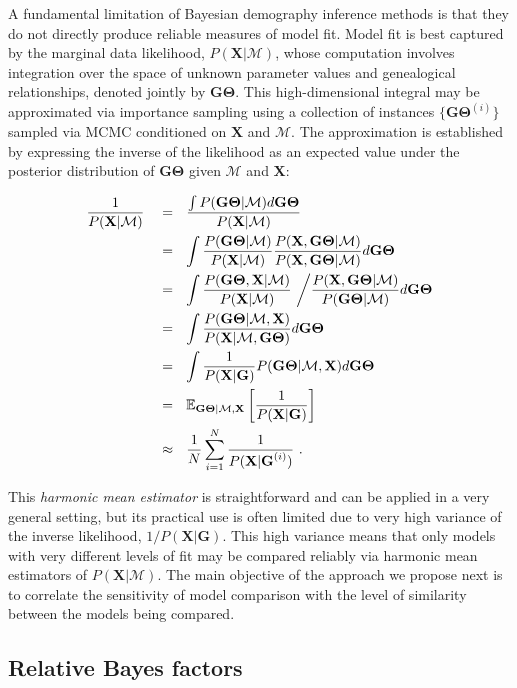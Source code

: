 \documentclass[11pt]{article}
\newcommand{\vect}[1]{\boldsymbol{\mathbf{#1}}}
\newcommand{\E}{\mathbb{E}}
\newcommand{\X}{\vect{X}}
\newcommand{\M}{\mathcal{M}}
\newcommand{\G}{\vect{G}}
\newcommand{\T}{\vect{\Theta}}
\newcommand{\GT}{\G\T}
\newcommand{\1}{\mathbbm{1}}
\begin{document}
A fundamental limitation of Bayesian demography inference methods is that they do not directly produce reliable measures of model fit.
%
Model fit is best captured by the marginal data likelihood, $P(\X|\M)$, whose computation involves integration over the space of unknown parameter values and genealogical relationships,
denoted jointly by $\GT$.
%
This high-dimensional integral may be approximated via importance sampling using a collection of instances $\{\GT^{(i)}\}$ sampled via MCMC conditioned on $\X$ and $\M$.
%
The approximation is established by expressing the inverse of the likelihood as an expected value under the posterior distribution of $\GT$ given $\M$ and $\X$:
%
%
\begin{small}
\begin{align}
\frac{1}{P(\X|\M)} ~~~
&=~~ \frac{\int P(\GT|\M)d\GT}{P(\X|\M)} \notag \\ %
&=~~ \int \frac{P(\GT|\M)}{P(\X|\M)} \frac{P(\X,\GT|\M)}{P(\X,\GT|\M)}  d\GT \notag \\ %
&=~~ \int \frac{P(\GT,\X |\M)}{P(\X|\M)} ~\bigg/ \frac{P(\X,\GT|\M)}{P(\GT|\M)}  d\GT \notag \\ %
&=~~ \int \frac{P(\GT|\M,\X)}{P(\X|\M,\GT)} d\GT \notag \\ %
&=~~ \int \frac{1}{P(\X|\G)}P(\GT|\M,\X) d\GT  \notag \\ %
&=~~ \E_{\GT|\M,\X } \left[\frac{1}{P(\X|\G)}\right] \notag\\  %
&\approx~~ \frac{1}{N} \sum_{i=1}^{N}\frac{1}{P(\X|\G^{(i)})} ~. \label{eq:harmonic}
\end{align}
\end{small}

This {\em harmonic mean estimator} is straightforward and can be applied in a very general setting, but its practical use is often limited due to very high variance
of the inverse likelihood, $1/P(\X|\G)$.
%
This high variance means that only models with very different levels of fit may be compared reliably via harmonic mean estimators of $P(\X|\M)$.
%
The main objective of the approach we propose next is to correlate the sensitivity of model comparison with the level of similarity between the models being compared.
%

\subsection{Relative Bayes factors}
\end{document}

